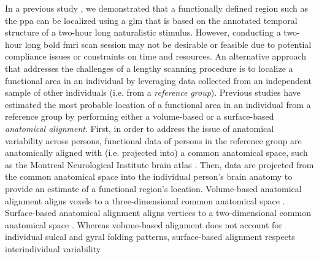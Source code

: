 In a previous study \citep{haeusler2022processing}, we demonstrated that a
functionally defined region such as the \ac{ppa} can be localized using  a
\acf{glm} that is based on the annotated temporal structure of a two-hour long
naturalistic stimulus.
However, conducting a two-hour long \ac{bold} \ac{fmri} scan session may not be
desirable or feasible due to potential compliance issues or constraints on time
and resources.
An alternative approach that addresses the challenges of a lengthy scanning
procedure is to localize a functional area in an individual by leveraging data
collected from an independent sample of other individuals (i.e.  from a
\textit{reference group}).
Previous studies have estimated the most probable location of a functional area
in an individual from a reference group by performing either a volume-based
\citep{zhen2017quantifying, zhen2015quantifying} or a surface-based
\citep{frost2012measuring, weiner2018defining, rosenke2021probabilistic,
wang2015probabilistic} \textit{anatomical alignment}.
%
First, in order to address the issue of anatomical variability across persons,
functional data of persons in the reference group are anatomically aligned with
(i.e.  projected into) a common anatomical space, such as the Montreal
Neurological Institute brain atlas \citep[MNI152 atlas;][]{fonov2011unbiased}.
Then, data are projected from the common anatomical space into the
individual person's brain anatomy to provide an estimate of a functional
region's location.
Volume-based anatomical alignment \citep[s.][for a review]{klein2009evaluation}
aligns voxels to a three-dimensional common anatomical space \citep[e.g., MNI152
atlas;][]{fonov2011unbiased}.
Surface-based anatomical alignment \citep{fischl1999cortical, yeo2009spherical}
aligns vertices to a two-dimensional common anatomical space \citep[e.g.,
FreeSurfer's fsaverage template;][]{fischl1999high}.
Whereas volume-based alignment does not account for individual sulcal and gyral
folding patterns, surface-based alignment respects interindividual variability

